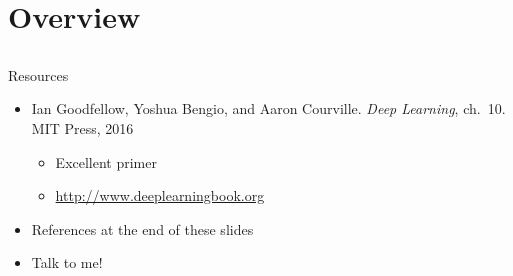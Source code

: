 \section{Overview}
\subsection{}

\begin{frame}{Resources}
    \begin{itemize}
        \item Ian Goodfellow, Yoshua Bengio, and Aaron Courville.
        \emph{Deep Learning}, ch.~10. MIT Press, 2016
        \nocite{GoodfellowDL}
        \begin{itemize}
            \item Excellent primer
            \item \textcolor{blue}{\url{http://www.deeplearningbook.org}}
        \end{itemize}
        \item References at the end of these slides
        \item Talk to me! \smiley
    \end{itemize}
\end{frame}

